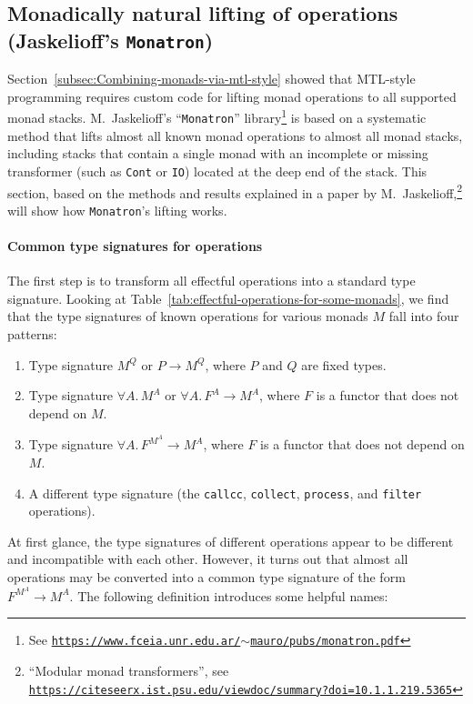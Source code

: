 \subsection{Monadically natural lifting of operations (Jaskelioff\textsf{'}s \texttt{Monatron})}

Section~\ref{subsec:Combining-monads-via-mtl-style} showed that
MTL-style programming requires custom code for lifting monad operations
to all supported monad stacks. M.~Jaskelioff\textsf{'}s
\textsf{``}\texttt{Monatron}\textsf{''} library\footnote{See \texttt{\href{https://www.fceia.unr.edu.ar/~mauro/pubs/monatron.pdf}{https://www.fceia.unr.edu.ar/$\sim$mauro/pubs/monatron.pdf}}}
is based on a systematic method that lifts almost all known monad
operations to almost all monad stacks, including stacks that contain
a single monad with an incomplete or missing transformer (such as
\lstinline!Cont! or \lstinline!IO!) located at the deep end of the
stack. This section, based on the methods and results explained in
a paper by M.~Jaskelioff,\footnote{\textsf{``}Modular monad transformers\textsf{''}, see \texttt{\href{https://citeseerx.ist.psu.edu/viewdoc/summary?doi=10.1.1.219.5365}{https://citeseerx.ist.psu.edu/viewdoc/summary?doi=10.1.1.219.5365}}}
will show how \texttt{Monatron}\textsf{'}s lifting works. 

\paragraph{Common type signatures for operations}

The first step is to transform all effectful operations into a standard
type signature. Looking at Table~\ref{tab:effectful-operations-for-some-monads},
we find that the type signatures of known operations for various monads
$M$ fall into four patterns: 
\begin{enumerate}
\item Type signature $M^{Q}$ or $P\rightarrow M^{Q}$, where $P$ and $Q$
are fixed types.
\item Type signature $\forall A.\,M^{A}$ or $\forall A.\,F^{A}\rightarrow M^{A}$,
where $F$ is a functor that does not depend on $M$.
\item Type signature $\forall A.\,F^{M^{A}}\rightarrow M^{A}$, where $F$
is a functor that does not depend on $M$.
\item A different type signature (the \lstinline!callcc!, \lstinline!collect!,
\lstinline!process!, and \lstinline!filter! operations).
\end{enumerate}
At first glance, the type signatures of different operations appear
to be different and incompatible with each other. However, it turns
out that almost all operations may be converted into a common type
signature of the form $F^{M^{A}}\rightarrow M^{A}$. The following
definition introduces some helpful names:

